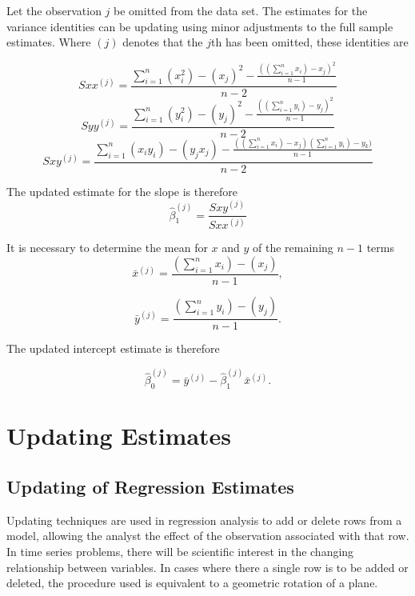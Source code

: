 \documentclass[a4paper,12pt]{article}
\begin{document}
Let the observation $j$ be omitted from the data set. The estimates for the variance identities can be updating using minor adjustments to the full sample estimates. Where $(j)$ denotes that the $j$th has been omitted, these identities are


\begin{equation}
Sxx^{(j)}=\frac{\sum_{i=1}^{n}(x_{i}^{2})-(x_{j})^{2}-\frac{((\sum_{i=1}^{n}x_{i})-x_{j})^{2}}{n-1}}{n-2}
\end{equation}
\begin{equation}
Syy^{(j)}=\frac{\sum_{i=1}^{n}(y_{i}^{2})-(y_{j})^{2}-\frac{((\sum_{i=1}^{n}y_{i})-y_{j})^{2}}{n-1}}{n-2}
\end{equation}
\begin{equation}
Sxy^{(j)}=\frac{\sum_{i=1}^{n}(x_{i}y_{i})-(y_{j}x_{j})-\frac{((\sum_{i=1}^{n}x_{i})-x_{j})(\sum_{i=1}^{n}y_{i})-y_{k})}{n-1}}{n-2}
\end{equation}


The updated estimate for the slope is therefore
\begin{equation}
\hat{\beta}_{1}^{(j)}=\frac{Sxy^{(j)}}{Sxx^{(j)}}
\end{equation}


It is necessary to determine the mean for $x$ and $y$ of the
remaining $n-1$ terms
\begin{equation}
\bar{x}^{(j)}=\frac{(\sum_{i=1}^{n}x_{i})-(x_{j})}{n-1},
\end{equation}


\begin{equation}
\bar{y}^{(j)}=\frac{(\sum_{i=1}^{n}y_{i})-(y_{j})}{n-1}.
\end{equation}


The updated intercept estimate is therefore


\begin{equation}
\hat{\beta}_{0}^{(j)}=\bar{y}^{(j)}-\hat{\beta}_{1}^{(j)}\bar{x}^{(j)}.
\end{equation}


\newpage
\section{Updating Estimates} %


\subsection{Updating of Regression Estimates}
Updating techniques are used in regression analysis to add or delete rows from a model, allowing the analyst the effect of the observation associated with that row. In time series problems, there will be scientific interest in the changing relationship between variables. In cases where there a single row is to be added or deleted, the procedure used is equivalent to a geometric rotation of a plane.
\end{document}
